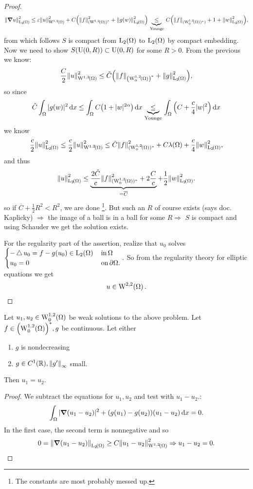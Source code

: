 \documentclass{article}
\begin{document}
\begin{example}
\begin{proof}
		\[
			\norm{\grad u}_{\LpSet[2]{\Omega}}^{2} \leq \varepsilon \norm{u}_{\WkpSet[1][2]{\Omega}}^{2} + C\qty(\norm{f}_{\qty(\WkpSet[1][2]{\Omega})^{*}}^{2}+\norm{g(w)}_{\LpSet[2]{\Omega}}^{2}) \underbrace{\leq}_{\, \text{Younge}} \,C\qty(\norm{f}_{(\WkpzeroSet[1][2]{\Omega})^{*})}+1+\norm{w}_{\LpSet[2]{\Omega}}^{2}),
		\]
		from which follows $S$ is compact from $\LpSet[2]{\Omega}$ to $\LpSet[2]{\Omega}$ by compact embedding. Now we need to show $S\qty(\text{U}(0,R)) \subset \text{U}(0,R)$ for some $R>0.$ From the previous we know:
		\[
			\frac{C}{2}\norm{u}_{\WkpSet[1][2]{\Omega}}^{2} \leq \tilde{C}\qty(\norm{f}_{\qty(\WkpzeroSet[1][2]{\Omega})^{*}}+\norm{g}_{\LpSet[2]{\Omega}}^{2}),
		\]
		so since
		\[
			\tilde{C}\int_{\Omega}|g(w)|^{2}\dd{x} \leq \int_{\Omega}C\qty(1+|w|^{2 \alpha})\dd{x} \underbrace{\leq}_{\, \text{Younge} \,} \int_{\Omega}\qty(C+ \frac{c}{4}|w|^{2})\dd{x}
		\]
		we know
		\[
			\frac{c}{2}\norm{u}_{\LpSet[2]{\Omega}}^{2} \leq \frac{c}{2} \norm{u}_{\WkpSet[1][2]{\Omega}}^{2} \leq \tilde{C}\norm{f}_{(\WkpzeroSet[1][2]{\Omega})^{*}}^{2}+C \lambda\qty(\Omega)+ \frac{c}{4}\norm{w}_{\LpSet[2]{\Omega}}^{2},
		\]
		and thus
		\[
			\norm{u}_{\LpSet[2]{\Omega}}^{2} \leq \underbrace{\frac{2 \tilde{C}}{c} \norm{f}_{(\WkpzeroSet[1][2]{\Omega})^{*}}^{2} + 2 \frac{C}{c}}_{=\overline{C}}+\frac{1}{2}\norm{w}_{\LpSet[2]{\Omega}}^{2}.
		\]
		so if $\overline{C} + \frac{1}{2}R^{2}<R^{2}$, we are done \footnote{The constants are most probably messed up.}. But such an $R$ of course exists (says doc. Kaplicky) $\Rightarrow$ the image of a ball is in a ball for some $R \Rightarrow$ $S$ is compact and using Schauder we get the solution exists.

		For the regularity part of the assertion, realize that $u_0$ solves 
		$\begin{cases}
			-\laplace u_0 = f-g(u_0) \in \LpSet[2]{\Omega} & \, \text{in} \, \Omega \\
			u_0 = 0 & \, \text{on} \, \partial \Omega. 
		\end{cases}.$ So from the regularity theory for elliptic equations we get
		\[
			u \in \WkpSet[2][2]{\Omega}.
		\]
	\end{proof}
	\begin{theorem}[Uniqueness]
		Let $u_1, u_2 \in \WkpzeroSet[1][2]{\Omega}$ be weak solutions to the above problem. Let $f \in \qty(\WkpzeroSet[1][2]{\Omega})^{*},g$ be continuous. Let either 
		\begin{enumerate}
			\item $g$ is nondecreasing
			\item $g \in C^1\qty({\mathbb R}), \norm{g'}_{\infty}$ small.
		\end{enumerate}
		Then $u_1 = u_2$.
	\end{theorem}
	\begin{proof}
		We subtract the equations for $u_1, u_2$ and test with $u_1 - u_2.$:
		\[
			\int_{\Omega}|\grad(u_1 - u_2)|^{2} + (g(u_1)-g(u_2))\qty(u_1-u_2)\dd{x} = 0.
		\]
		In the first case, the second term is nonnegative and so
		\[
			0=\norm{\grad(u_1 - u_2)}_{\LpSet[2]{\Omega}} \geq C \norm{u_1 - u_2}_{\WkpSet[1][2]{\Omega}}^{2} \Rightarrow u_1 - u_2 = 0.
		\]


\end{proof}
\end{example}
\end{document}

